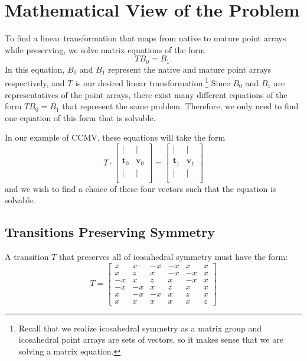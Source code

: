 \documentclass[a4paper,10pt]{article}
\theoremstyle{plain}
\theoremstyle{definition}
\theoremstyle{remark}
\renewcommand{\vec}[1]{\textbf{#1}}
\begin{document}
\section{Mathematical View of the Problem}
To find a linear transformation that maps from native to mature point arrays while preserving, we solve matrix equations of the form \[TB_0 = B_1.\]
In this equation, \(B_0\) and \(B_1\) represent the native and mature point arrays respectively, and \(T\) is our desired linear transformation.\footnote{Recall that we realize icosahedral symmetry as a matrix group and icosahedral point arrays are sets of vectors, so it makes sense that we are solving a matrix equation.}
Since \(B_0\) and \(B_1\) are representatives of the point arrays, there exist many different equations of the form \(TB_0 = B_1\) that represent the same problem.
Therefore, we only need to find one equation of this form that is solvable.

In our example of CCMV, these equations will take the form \[T\cdot \begin{bmatrix}
    | & | \\
    \vec{t}_0 & \vec{v}_0 \\
    | & | \\
\end{bmatrix} = \begin{bmatrix}
    | & | \\
    \vec{t}_1 & \vec{v}_1 \\
    | & | \\
\end{bmatrix}\]
and we wish to find a choice of these four vectors such that the equation is solvable.

\subsection{Transitions Preserving Symmetry}
A transition \(T\) that preserves all of icosahedral symmetry must have the form: \begin{equation} \label{centralizer:ico}
T = \begin{bmatrix}
    z  & x  & -x & -x & x  & x \\
    x  & z  & x  & -x & -x & x \\
    -x & x  & z  & x  & -x & x \\
    -x & -x & x  & z  & x  & x \\
    x  & -x & -x & x  & z  & x \\
    x  & x  & x  & x  & x  & z
\end{bmatrix}\end{equation}
\end{document}
